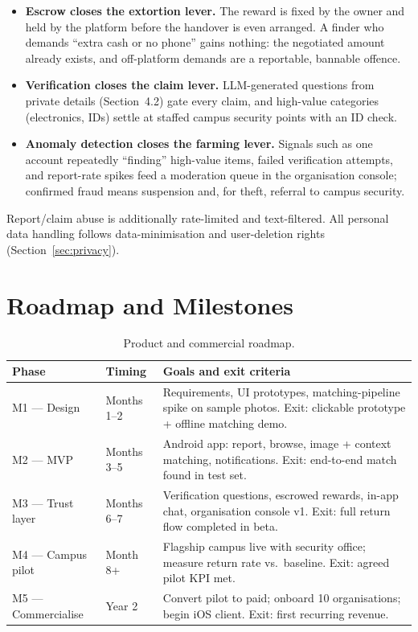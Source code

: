 \documentclass[11pt,a4paper]{article}
\begin{document}
\begin{itemize}
  \item \textbf{Escrow closes the extortion lever.} The reward is fixed by the owner and
        held by the platform before the handover is even arranged. A finder who demands
        ``extra cash or no phone'' gains nothing: the negotiated amount already exists,
        and off-platform demands are a reportable, bannable offence.
  \item \textbf{Verification closes the claim lever.} LLM-generated questions from private
        details (Section~4.2) gate every claim, and high-value categories (electronics,
        IDs) settle at staffed campus security points with an ID check.
  \item \textbf{Anomaly detection closes the farming lever.} Signals such as one account
        repeatedly ``finding'' high-value items, failed verification attempts, and
        report-rate spikes feed a moderation queue in the organisation console; confirmed
        fraud means suspension and, for theft, referral to campus security.
\end{itemize}

Report/claim abuse is additionally rate-limited and text-filtered. All personal data
handling follows data-minimisation and user-deletion rights (Section~\ref{sec:privacy}).

\section{Roadmap and Milestones}

\begin{table}[H]
\centering
\small
\renewcommand{\arraystretch}{1.35}
\begin{tabularx}{\textwidth}{l l Y}
\toprule
\textbf{Phase} & \textbf{Timing} & \textbf{Goals and exit criteria} \\
\midrule
M1 --- Design & Months 1--2 & Requirements, UI prototypes, matching-pipeline spike on
sample photos. Exit: clickable prototype + offline matching demo. \\
M2 --- MVP & Months 3--5 & Android app: report, browse, image + context matching,
notifications. Exit: end-to-end match found in test set. \\
M3 --- Trust layer & Months 6--7 & Verification questions, escrowed rewards, in-app chat,
organisation console v1. Exit: full return flow completed in beta. \\
M4 --- Campus pilot & Month 8+ & Flagship campus live with security office; measure
return rate vs.\ baseline. Exit: agreed pilot KPI met. \\
M5 --- Commercialise & Year 2 & Convert pilot to paid; onboard 10 organisations; begin
iOS client. Exit: first recurring revenue. \\
\bottomrule
\end{tabularx}
\caption{Product and commercial roadmap.}
\end{table}
\end{document}
